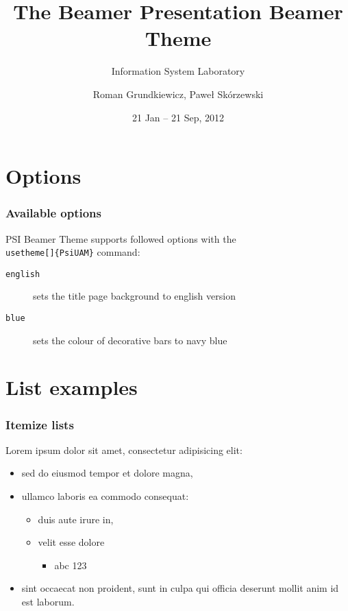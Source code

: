\documentclass{beamer}
\title{The Beamer Presentation Beamer Theme}
\subtitle{Information System Laboratory}
\author[{R. Grundkiewicz, P. Sk{\'o}rzewski}]{Roman Grundkiewicz, Pawe{\l} Sk{\'o}rzewski}
\date{21 Jan -- 21 Sep, 2012}
\begin{document}
\begin{frame}
	\titlepage
\end{frame}


\section{Options}

\begin{frame}
	\frametitle{Available options}
    PSI Beamer Theme supports followed options with the 
    \texttt{\\usetheme[]\{PsiUAM\}} command:
		\begin{description}
 			\item [\texttt{english}] sets the title page background to english version
 			\item [\texttt{blue}] sets the colour of decorative bars to navy blue
 		\end{description}
\end{frame}

\section{List examples}

\begin{frame}

	\frametitle{Itemize lists}
    Lorem ipsum dolor sit amet, consectetur adipisicing elit:
		\begin{itemize}
			\item sed do eiusmod tempor et dolore magna,
      \item ullamco laboris ea commodo consequat:
      \begin{itemize}
        \item duis aute irure in,
        \item velit esse dolore
        \begin{itemize}
          \item abc 123
         \end{itemize}
      \end{itemize}
      \item sint occaecat non proident, sunt in culpa qui officia 
        deserunt mollit anim id est laborum.
		\end{itemize}

\end{frame}
\end{document}
